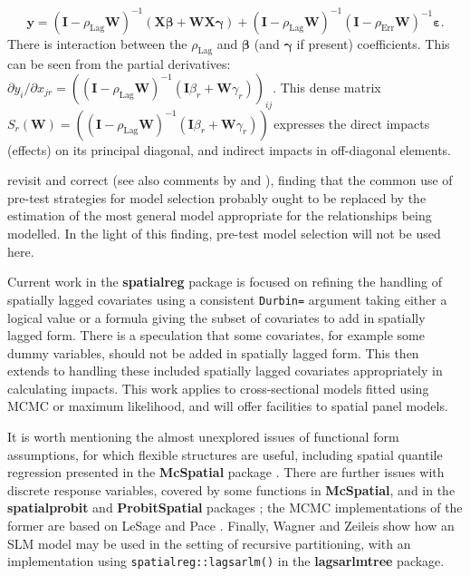\documentclass[]{book}
\begin{document}
\[
{\mathbf y} = ({\mathbf I} - \rho_{\mathrm{Lag}} {\mathbf W})^{-1}({\mathbf X}{\mathbf \beta} + {\mathbf W}{\mathbf X}{\mathbf \gamma}) + ({\mathbf I} - \rho_{\mathrm{Lag}} {\mathbf W})^{-1}({\mathbf I} - \rho_{\mathrm{Err}} {\mathbf W})^{-1}{\mathbf \varepsilon}.
\]
There is interaction between the \(\rho_{\mathrm{Lag}}\) and \({\mathbf \beta}\) (and \({\mathbf \gamma}\) if present) coefficients. This can be seen from the partial derivatives: \(\partial y_i / \partial x_{jr} = (({\mathbf I} - \rho_{\mathrm{Lag}} {\mathbf W})^{-1} ({\mathbf I} \beta_r + {\mathbf W} \gamma_r))_{ij}\). This dense matrix \(S_r({\mathbf W}) = (({\mathbf I} - \rho_{\mathrm{Lag}} {\mathbf W})^{-1} ({\mathbf I} \beta_r + {\mathbf W} \gamma_r))\) expresses the direct impacts (effects) on its principal diagonal, and indirect impacts in off-diagonal elements.

\citet{PIRAS2014103} revisit and correct \citet{FLORAX2003557} (see also comments by \citet{HENDRY2006309} and \citet{FLORAX2006300}), finding that the common use of pre-test strategies for model selection probably ought to be replaced by the estimation of the most general model appropriate for the relationships being modelled. In the light of this finding, pre-test model selection will not be used here.

Current work in the \textbf{spatialreg} package is focused on refining the handling of spatially lagged covariates using a consistent \texttt{Durbin=} argument taking either a logical value or a formula giving the subset of covariates to add in spatially lagged form. There is a speculation that some covariates, for example some dummy variables, should not be added in spatially lagged form. This then extends to handling these included spatially lagged covariates appropriately in calculating impacts. This work applies to cross-sectional models fitted using MCMC or maximum likelihood, and will offer facilities to spatial panel models.

It is worth mentioning the almost unexplored issues of functional form assumptions, for which flexible structures are useful, including spatial quantile regression presented in the \textbf{McSpatial} package \citep{mcmillen:13}. There are further issues with discrete response variables, covered by some functions in \textbf{McSpatial}, and in the \textbf{spatialprobit} and \textbf{ProbitSpatial} packages \citep{RJ-2013-013, MARTINETTI201730}; the MCMC implementations of the former are based on LeSage and Pace \citeyearpar{lesage+pace:09}. Finally, Wagner and Zeileis \citeyearpar{wagner+zeileis:19} show how an SLM model may be used in the setting of recursive partitioning, with an implementation using \texttt{spatialreg::lagsarlm()} in the \textbf{lagsarlmtree} package.
\end{document}

